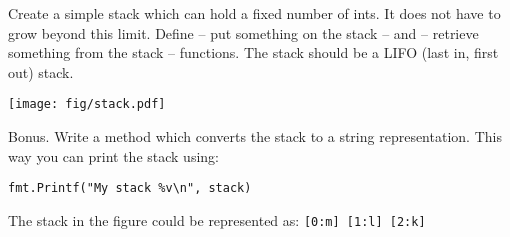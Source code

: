\begin{Exercise}[title={Stack},difficulty=1]
\label{ex:stack}
\Question \label{ex:stack q1} Create a simple stack which can hold a
fixed number of ints. It does not have to grow beyond this limit.
Define  -- put something on the stack -- and 
-- retrieve something from the stack -- functions. The stack should be
a LIFO (last in, first out) stack.

\begin{center}
\texttt{[image: fig/stack.pdf]}
\label{fig:stack}
\end{center}

\Question \label{ex:stack q2} Bonus. Write a  method which 
converts the stack to a string representation.  This way you can print the stack using:

\begin{lstlisting}
fmt.Printf("My stack %v\n", stack)
\end{lstlisting}

\noindent{}The stack in the figure could be represented as:
\texttt{[0:m] [1:l] [2:k]}

\end{Exercise}

